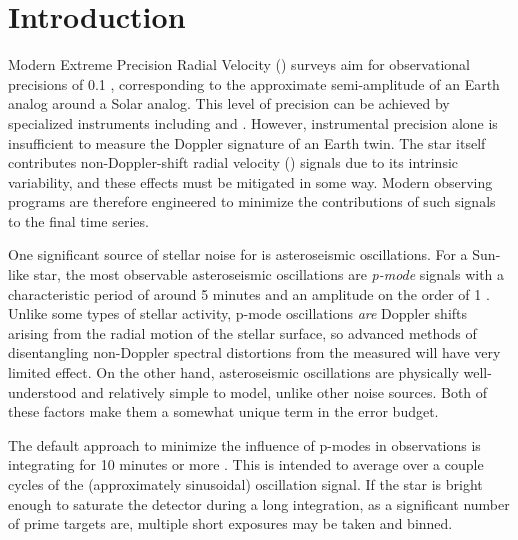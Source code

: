 \documentclass[modern]{aastex62}
\begin{document}
\section{Introduction}
\label{s:intro}

Modern Extreme Precision Radial Velocity (\EPRV) surveys aim for observational precisions of 0.1 \ms, corresponding to the approximate semi-amplitude of an Earth analog around a Solar analog. 
This level of precision can be achieved by specialized instruments including \EXPRES and \ESPRESSO \citep{Petersburg2020, Pepe2021}. 
However, instrumental precision alone is insufficient to measure the Doppler signature of an Earth twin. 
The star itself contributes non-Doppler-shift radial velocity (\RV) signals due to its intrinsic variability, and these effects must be mitigated in some way. 
Modern observing programs are therefore engineered to minimize the contributions of such signals to the final \RV time series.

One significant source of stellar noise for \EPRV is asteroseismic oscillations. 
For a Sun-like star, the most observable asteroseismic oscillations are \textit{p-mode} signals with a characteristic period of around 5 minutes and an amplitude on the order of 1 \ms. 
Unlike some types of stellar activity, p-mode oscillations \textit{are} Doppler shifts arising from the radial motion of the stellar surface, so advanced methods of disentangling non-Doppler spectral distortions from the measured \RV will have very limited effect. 
On the other hand, asteroseismic oscillations are physically well-understood and relatively simple to model, unlike other \RV noise sources. 
Both of these factors make them a somewhat unique term in the \EPRV error budget.

The default approach to minimize the influence of p-modes in \EPRV observations is integrating for 10 minutes or more \citep{Dumusque2011}. 
This is intended to average over a couple cycles of the (approximately sinusoidal) oscillation signal. 
If the star is bright enough to saturate the detector during a long integration, as a significant number of prime \EPRV targets are, multiple short exposures may be taken and binned. 
\end{document}
